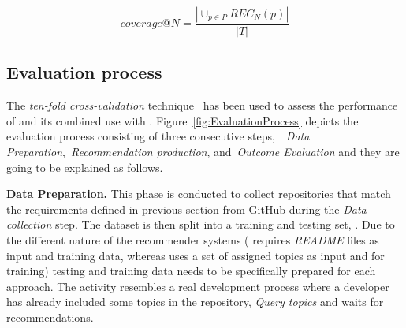 \begin{equation}\label{eqn:Coverage}
coverage@N = \frac{\left | \cup_{p\in P} REC_{N}(p) \right | }{\left | T \right |} 
\end{equation}






\subsection{Evaluation process}\label{sec:methodology-metric}



The \emph{ten-fold cross-validation} technique~\cite{kohavi1995study} has been 
used to assess the performance of \TF and its combined use with \MNB. %
%
Figure~\ref{fig:EvaluationProcess} depicts the evaluation process consisting of 
three consecutive steps,~\ie~\emph{Data Preparation},~\emph{Recommendation 
production}, 
and~\emph{Outcome Evaluation} and they are going to be explained as 
follows.

\vspace{.1cm}
\noindent\textbf{Data Preparation.}
This phase is conducted to collect repositories that match the requirements defined in previous section from GitHub during the \textit{Data collection} step. %
The dataset is then split into a training and testing set, \ie {}. Due to the different nature of the recommender systems (\ie \MNB 
requires \textit{README} files as input and training data, whereas \TF uses a 
set of assigned topics as input and for training) testing and training 
data needs to be specifically prepared for each approach.
The  activity resembles a real development process where a developer has already included some topics in the repository, \ie \textit{Query topics} and waits for recommendations. 


